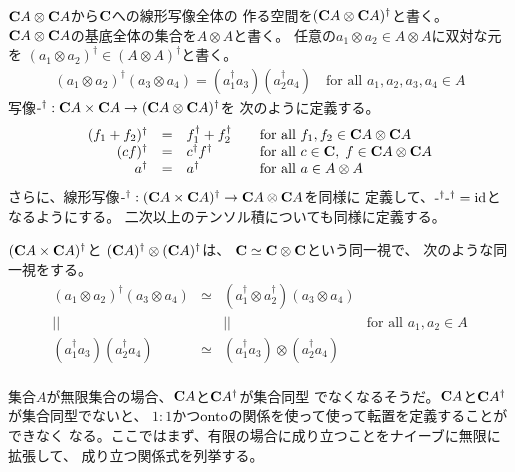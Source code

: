 	${\mathbf{C}}A\otimes {\mathbf{C}}A$から${\mathbf{C}}$への線形写像全体の
	作る空間を$({\mathbf{C}}A\otimes{\mathbf{C}}A)^\dag$と書く。
	${\mathbf{C}}A\otimes {\mathbf{C}}A$の基底全体の集合を$A\otimes A$と書く。
	任意の$a_1\otimes a_2\in A\otimes A$に双対な元を
	$(a_1\otimes a_2)^\dag\in(A\otimes A)^\dag$と書く。
	\begin{equation*}\begin{split} %
		(a_1\otimes a_2)^\dag(a_3\otimes a_4) = (a_1^\dag a_3)(a_2^\dag a_4)
		\quad\text{for all }a_1,a_2,a_3,a_4\in A
	\end{split}\end{equation*} %
	写像$\myhere^\dag:
	\mybf{C}A\times\mybf{C}A\to(\mybf{C}A\otimes\mybf{C}A)^\dag$を
	次のように定義する。
	\begin{equation*}\begin{array}{rcll} %
		(f_1+f_2)^\dag &=& f_1^\dag + f_2^\dag
			& \quad\text{for all }f_1,f_2\in \mybf{C}A\otimes\mybf{C}A \\
		(cf)^\dag &=& c^\dag f^\dag
			& \quad\text{for all }c\in \mybf{C},\;f\in\mybf{C}A\otimes\mybf{C}A \\
		a^\dag &=& a^\dag & \quad\text{for all }a\in A\otimes A \\
	\end{array}\end{equation*} %
	さらに、線形写像$\myhere^\dag:
	(\mybf{C}A\times\mybf{C}A)^\dag\to\mybf{C}A\otimes\mybf{C}A$を同様に
	定義して、$\myhere^\dag\myhere^\dag=\myid$となるようにする。
	二次以上のテンソル積についても同様に定義する。

	$({\mathbf{C}}A\times{\mathbf{C}}A)^\dag$と
	$({\mathbf{C}}A)^\dag\otimes({\mathbf{C}}A)^\dag$は、
	${\mathbf{C}}\simeq{\mathbf{C}}\otimes{\mathbf{C}}$という同一視で、
	次のような同一視をする。
	\begin{equation*}\begin{array}{cccl} %
		(a_1\otimes a_2)^\dag(a_3\otimes a_4) 
			&\simeq& (a_1^\dag\otimes a_2^\dag)(a_3\otimes a_4) \\
		|| && || & \text{for all }a_1,a_2\in A \\
		(a_1^\dag a_3)(a_2^\dag a_4) 
			&\simeq& (a_1^\dag a_3)\otimes (a_2^\dag a_4) \\
	\end{array}\end{equation*} %

	\begin{note}[無限の場合]\label{note:無限の場合} %
		集合$A$が無限集合の場合、${\mathbf{C}}A$と${\mathbf{C}}A^\dag$が集合同型
		でなくなるそうだ。${\mathbf{C}}A$と${\mathbf{C}}A^\dag$が集合同型でないと、
		$1:1$かつ$\operatorname{onto}$の関係を使って使って転置を定義することができなく
		なる。ここではまず、有限の場合に成り立つことをナイーブに無限に拡張して、
		成り立つ関係式を列挙する。
	\end{note} %

